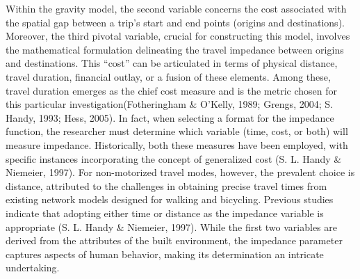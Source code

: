 \documentclass[12pt,twoside]{reedthesis}
\begin{document}
Within the gravity model, the second variable concerns the cost associated with the spatial gap between a trip's start and end points (origins and destinations). Moreover, the third pivotal variable, crucial for constructing this model, involves the mathematical formulation delineating the travel impedance between origins and destinations. This ``cost'' can be articulated in terms of physical distance, travel duration, financial outlay, or a fusion of these elements. Among these, travel duration emerges as the chief cost measure and is the metric chosen for this particular investigation(Fotheringham \& O'Kelly, 1989; Grengs, 2004; S. Handy, 1993; Hess, 2005). In fact, when selecting a format for the impedance function, the researcher must determine which variable (time, cost, or both) will measure impedance. Historically, both these measures have been employed, with specific instances incorporating the concept of generalized cost (S. L. Handy \& Niemeier, 1997). For non-motorized travel modes, however, the prevalent choice is distance, attributed to the challenges in obtaining precise travel times from existing network models designed for walking and bicycling. Previous studies indicate that adopting either time or distance as the impedance variable is appropriate (S. L. Handy \& Niemeier, 1997). While the first two variables are derived from the attributes of the built environment, the impedance parameter captures aspects of human behavior, making its determination an intricate undertaking.
\end{document}
